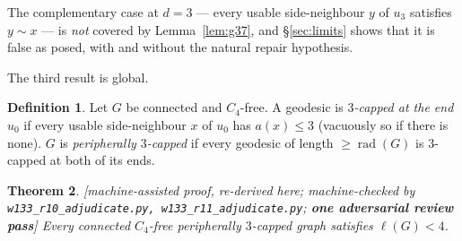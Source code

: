 \documentclass[11pt]{article}
\theoremstyle{plain}
\newtheorem{theorem}{Theorem}[section]
\theoremstyle{definition}
\newtheorem{definition}[theorem]{Definition}
\theoremstyle{remark}
\numberwithin{equation}{section}
\newcommand{\rad}{\operatorname{rad}}
\newcommand{\statusbox}[1]{{\small\sloppy\textsf{[#1]}}}
\newcommand{\AD}[1]{\statusbox{machine-assisted proof, re-derived here;
machine-checked by \texttt{#1}; \textbf{one adversarial review pass}}}
\begin{document}
The complementary case at $d = 3$ --- every usable side-neighbour $y$ of $u_3$ satisfies
$y \sim x$ --- is \emph{not} covered by Lemma~\ref{lem:g37}, and \S\ref{sec:limits} shows
that it is false as posed, with and without the natural repair hypothesis.

The third result is global.

\begin{definition}
Let $G$ be connected and $C_4$-free. A geodesic is \emph{$3$-capped at the end $u_0$} if
every usable side-neighbour $x$ of $u_0$ has $a(x)\le 3$ (vacuously so if there is none).
$G$ is \emph{peripherally $3$-capped} if every geodesic of length $\ge \rad(G)$ is $3$-capped
at both of its ends.
\end{definition}

\begin{theorem}\label{thm:g38}
\AD{w133\_r10\_adjudicate.py, w133\_r11\_adjudicate.py}
Every connected $C_4$-free peripherally $3$-capped graph satisfies $\ell(G) < 4$.
\end{theorem}
\end{document}
